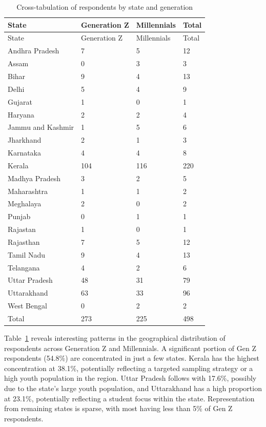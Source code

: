 \documentclass[
  letterpaper,
  DIV=11,
  numbers=noendperiod]{scrartcl}
\begin{document}
\begin{longtable}[]{@{}llll@{}}
\caption{Cross-tabulation of respondents by state and
generation}\label{tbl-state-generation}\tabularnewline
\toprule\noalign{}
State & Generation Z & Millennials & Total \\
\midrule\noalign{}
\endfirsthead
\toprule\noalign{}
State & Generation Z & Millennials & Total \\
\midrule\noalign{}
\endhead
\bottomrule\noalign{}
\endlastfoot
Andhra Pradesh & 7 & 5 & 12 \\
Assam & 0 & 3 & 3 \\
Bihar & 9 & 4 & 13 \\
Delhi & 5 & 4 & 9 \\
Gujarat & 1 & 0 & 1 \\
Haryana & 2 & 2 & 4 \\
Jammu and Kashmir & 1 & 5 & 6 \\
Jharkhand & 2 & 1 & 3 \\
Karnataka & 4 & 4 & 8 \\
Kerala & 104 & 116 & 220 \\
Madhya Pradesh & 3 & 2 & 5 \\
Maharashtra & 1 & 1 & 2 \\
Meghalaya & 2 & 0 & 2 \\
Punjab & 0 & 1 & 1 \\
Rajastan & 1 & 0 & 1 \\
Rajasthan & 7 & 5 & 12 \\
Tamil Nadu & 9 & 4 & 13 \\
Telangana & 4 & 2 & 6 \\
Uttar Pradesh & 48 & 31 & 79 \\
Uttarakhand & 63 & 33 & 96 \\
West Bengal & 0 & 2 & 2 \\
Total & 273 & 225 & 498 \\
\end{longtable}

Table~\ref{tbl-state-generation} reveals interesting patterns in the
geographical distribution of respondents across Generation Z and
Millennials. A significant portion of Gen Z respondents (54.8\%) are
concentrated in just a few states. Kerala has the highest concentration
at 38.1\%, potentially reflecting a targeted sampling strategy or a high
youth population in the region. Uttar Pradesh follows with 17.6\%,
possibly due to the state's large youth population, and Uttarakhand has
a high proportion at 23.1\%, potentially reflecting a student focus
within the state. Representation from remaining states is sparse, with
most having less than 5\% of Gen Z respondents.
\end{document}
